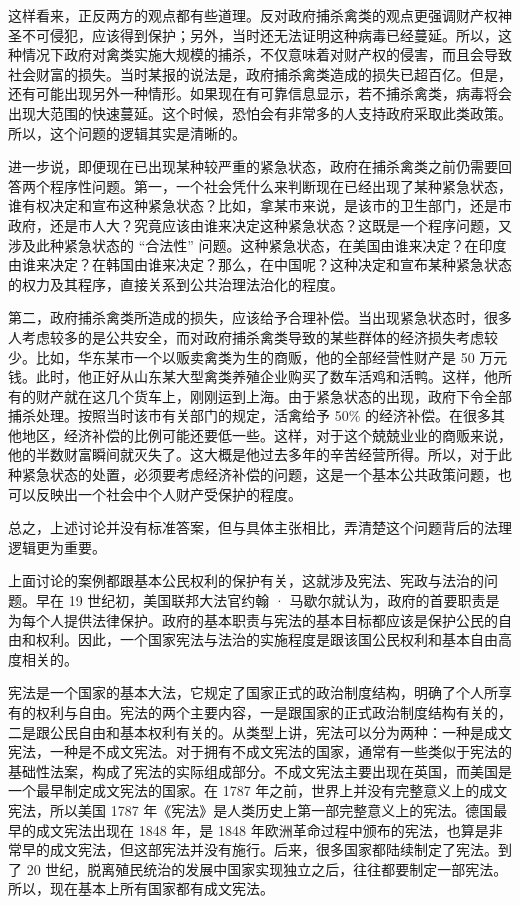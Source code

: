 这样看来，正反两方的观点都有些道理。反对政府捕杀禽类的观点更强调财产权神圣不可侵犯，应该得到保护；另外，当时还无法证明这种病毒已经蔓延。所以，这种情况下政府对禽类实施大规模的捕杀，不仅意味着对财产权的侵害，而且会导致社会财富的损失。当时某报的说法是，政府捕杀禽类造成的损失已超百亿。但是，还有可能出现另外一种情形。如果现在有可靠信息显示，若不捕杀禽类，病毒将会出现大范围的快速蔓延。这个时候，恐怕会有非常多的人支持政府采取此类政策。所以，这个问题的逻辑其实是清晰的。

进一步说，即便现在已出现某种较严重的紧急状态，政府在捕杀禽类之前仍需要回答两个程序性问题。第一，一个社会凭什么来判断现在已经出现了某种紧急状态，谁有权决定和宣布这种紧急状态？比如，拿某市来说，是该市的卫生部门，还是市政府，还是市人大？究竟应该由谁来决定这种紧急状态？这既是一个程序问题，又涉及此种紧急状态的 “合法性” 问题。这种紧急状态，在美国由谁来决定？在印度由谁来决定？在韩国由谁来决定？那么，在中国呢？这种决定和宣布某种紧急状态的权力及其程序，直接关系到公共治理法治化的程度。

第二，政府捕杀禽类所造成的损失，应该给予合理补偿。当出现紧急状态时，很多人考虑较多的是公共安全，而对政府捕杀禽类导致的某些群体的经济损失考虑较少。比如，华东某市一个以贩卖禽类为生的商贩，他的全部经营性财产是 50 万元钱。此时，他正好从山东某大型禽类养殖企业购买了数车活鸡和活鸭。这样，他所有的财产就在这几个货车上，刚刚运到上海。由于紧急状态的出现，政府下令全部捕杀处理。按照当时该市有关部门的规定，活禽给予 50\% 的经济补偿。在很多其他地区，经济补偿的比例可能还要低一些。这样，对于这个兢兢业业的商贩来说，他的半数财富瞬间就灭失了。这大概是他过去多年的辛苦经营所得。所以，对于此种紧急状态的处置，必须要考虑经济补偿的问题，这是一个基本公共政策问题，也可以反映出一个社会中个人财产受保护的程度。

总之，上述讨论并没有标准答案，但与具体主张相比，弄清楚这个问题背后的法理逻辑更为重要。


上面讨论的案例都跟基本公民权利的保护有关，这就涉及宪法、宪政与法治的问题。早在 19 世纪初，美国联邦大法官约翰 · 马歇尔就认为，政府的首要职责是为每个人提供法律保护。政府的基本职责与宪法的基本目标都应该是保护公民的自由和权利。因此，一个国家宪法与法治的实施程度是跟该国公民权利和基本自由高度相关的。

宪法是一个国家的基本大法，它规定了国家正式的政治制度结构，明确了个人所享有的权利与自由。宪法的两个主要内容，一是跟国家的正式政治制度结构有关的，二是跟公民自由和基本权利有关的。从类型上讲，宪法可以分为两种：一种是成文宪法，一种是不成文宪法。对于拥有不成文宪法的国家，通常有一些类似于宪法的基础性法案，构成了宪法的实际组成部分。不成文宪法主要出现在英国，而美国是一个最早制定成文宪法的国家。在 1787 年之前，世界上并没有完整意义上的成文宪法，所以美国 1787 年《宪法》是人类历史上第一部完整意义上的宪法。德国最早的成文宪法出现在 1848 年，是 1848 年欧洲革命过程中颁布的宪法，也算是非常早的成文宪法，但这部宪法并没有施行。后来，很多国家都陆续制定了宪法。到了 20 世纪，脱离殖民统治的发展中国家实现独立之后，往往都要制定一部宪法。所以，现在基本上所有国家都有成文宪法。

